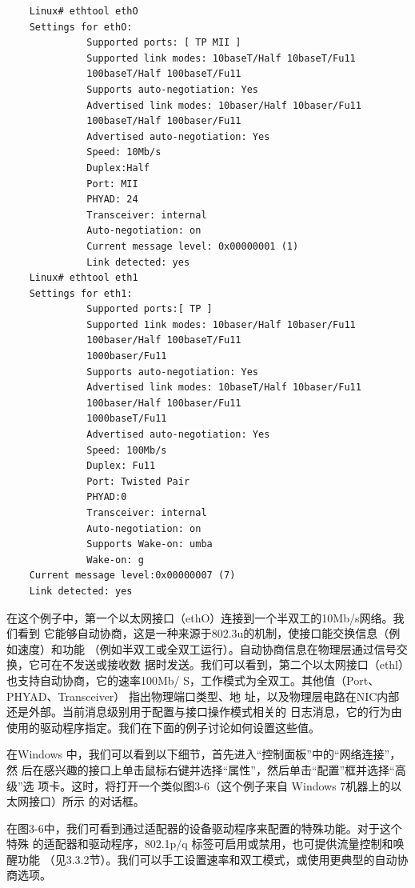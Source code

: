 \begin{verbatim}
    Linux# ethtool ethO
    Settings for ethO:
              Supported ports: [ TP MII ]
              Supported link modes: 10baseT/Half 10baseT/Fu11
              100baseT/Half 100baseT/Fu11
              Supports auto-negotiation: Yes
              Advertised link modes: 10baser/Half 10baser/Fu11
              100baseT/Half 100baser/Fu11
              Advertised auto-negotiation: Yes
              Speed: 10Mb/s
              Duplex:Half
              Port: MII
              PHYAD: 24
              Transceiver: internal
              Auto-negotiation: on
              Current message level: 0x00000001 (1)
              Link detected: yes
    Linux# ethtool eth1
    Settings for eth1:
              Supported ports:[ TP ]
              Supported 1ink modes: 10baser/Half 10baser/Fu11
              100baser/Half 100baseT/Fu11
              1000baser/Fu11
              Supports auto-negotiation: Yes
              Advertised link modes: 10baseT/Half 10baser/Fu11
              100baser/Half 100baser/Fu11
              1000baseT/Fu11
              Advertised auto-negotiation: Yes
              Speed: 100Mb/s
              Duplex: Fu11
              Port: Twisted Pair
              PHYAD:0
              Transceiver: internal
              Auto-negotiation: on
              Supports Wake-on: umba
              Wake-on: g
    Current message level:0x00000007 (7)
    Link detected: yes
\end{verbatim}

在这个例子中，第一个以太网接口（ethO）连接到一个半双工的10Mb/s网络。我们看到
它能够自动协商，这是一种来源于802.3u的机制，使接口能交换信息（例如速度）和功能
（例如半双工或全双工运行）。自动协商信息在物理层通过信号交换，它可在不发送或接收数
据时发送。我们可以看到，第二个以太网接口（ethl）也支持自动协商，它的速率100Mb/
S，工作模式为全双工。其他值（Port、PHYAD、Transceiver） 指出物理端口类型、地
址，以及物理层电路在NIC内部还是外部。当前消息级别用于配置与接口操作模式相关的
日志消息，它的行为由使用的驱动程序指定。我们在下面的例子讨论如何设置这些值。

在Windows 中，我们可以看到以下细节，首先进入“控制面板”中的“网络连接”，然
后在感兴趣的接口上单击鼠标右键并选择“属性”，然后单击“配置”框并选择“高级”选
项卡。这时，将打开一个类似图3-6（这个例子来自 Windows 7机器上的以太网接口）所示
的对话框。

在图3-6中，我们可看到通过适配器的设备驱动程序来配置的特殊功能。对于这个特殊
的适配器和驱动程序，802.1p/q 标签可启用或禁用，也可提供流量控制和唤醒功能
（见3.3.2节）。我们可以手工设置速率和双工模式，或使用更典型的自动协商选项。

